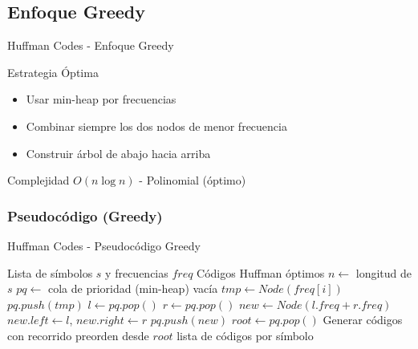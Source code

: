 \documentclass[aspectratio=169]{beamer}
\renewcommand{\algorithmicrequire}{\textbf{Entrada:}}
\renewcommand{\algorithmicensure}{\textbf{Salida:}}
\newcommand{\REQUIRE}{\State[\algorithmicrequire]}
\newcommand{\ENSURE}{\State[\algorithmicensure]}
\begin{document}
\subsection{Enfoque Greedy}
\begin{frame}{Huffman Codes - Enfoque Greedy}
\begin{block}{Estrategia Óptima}
\begin{itemize}
\item Usar min-heap por frecuencias
\item Combinar siempre los dos nodos de menor frecuencia
\item Construir árbol de abajo hacia arriba
\end{itemize}
\end{block}

\begin{alertblock}{Complejidad}
$O(n \log n)$ - Polinomial (óptimo)
\end{alertblock}
\end{frame}

\subsubsection{Pseudocódigo (Greedy)}
\begin{frame}[fragile]{Huffman Codes - Pseudocódigo Greedy}
\scriptsize
\begin{algorithmic}[1]
\REQUIRE Lista de símbolos $s$ y frecuencias $freq$
\ENSURE Códigos Huffman óptimos
\State $n \leftarrow$ longitud de $s$
\State $pq \leftarrow$ cola de prioridad (min-heap) vacía 
    \State $tmp \leftarrow Node(freq[i])$
    \State $pq.push(tmp)$
\EndFor
{}
    \State $l \leftarrow pq.pop()$ 
    \State $r \leftarrow pq.pop()$ 
    \State $new \leftarrow Node(l.freq + r.freq)$
    \State $new.left \leftarrow l$, $new.right \leftarrow r$
    \State $pq.push(new)$
\EndWhile
\State $root \leftarrow pq.pop()$
\State Generar códigos con recorrido preorden desde $root$
\Return lista de códigos por símbolo
\end{algorithmic}
\normalsize
\end{frame}
\end{document}
